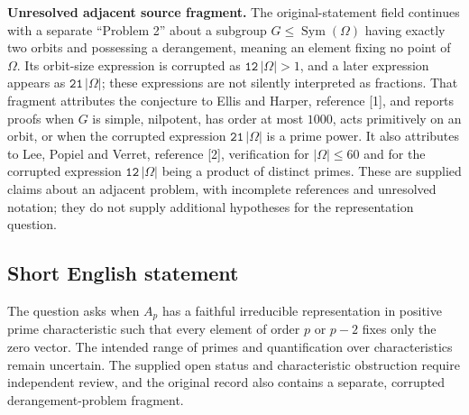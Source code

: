 \documentclass[11pt]{article}
\begin{document}
\textbf{Unresolved adjacent source fragment.} The original-statement field continues with a separate ``Problem 2'' about a subgroup \(G\leq\operatorname{Sym}(\Omega)\) having exactly two orbits and possessing a derangement, meaning an element fixing no point of \(\Omega\). Its orbit-size expression is corrupted as \(\texttt{12}\,|\Omega|>1\), and a later expression appears as \(\texttt{21}\,|\Omega|\); these expressions are not silently interpreted as fractions. That fragment attributes the conjecture to Ellis and Harper, reference [1], and reports proofs when \(G\) is simple, nilpotent, has order at most \(1000\), acts primitively on an orbit, or when the corrupted expression \(\texttt{21}\,|\Omega|\) is a prime power. It also attributes to Lee, Popiel and Verret, reference [2], verification for \(|\Omega|\leq60\) and for the corrupted expression \(\texttt{12}\,|\Omega|\) being a product of distinct primes. These are supplied claims about an adjacent problem, with incomplete references and unresolved notation; they do not supply additional hypotheses for the representation question.
\subsection{Short English statement}
The question asks when \(A_p\) has a faithful irreducible representation in positive prime characteristic such that every element of order \(p\) or \(p-2\) fixes only the zero vector. The intended range of primes and quantification over characteristics remain uncertain. The supplied open status and characteristic obstruction require independent review, and the original record also contains a separate, corrupted derangement-problem fragment.
\end{document}
